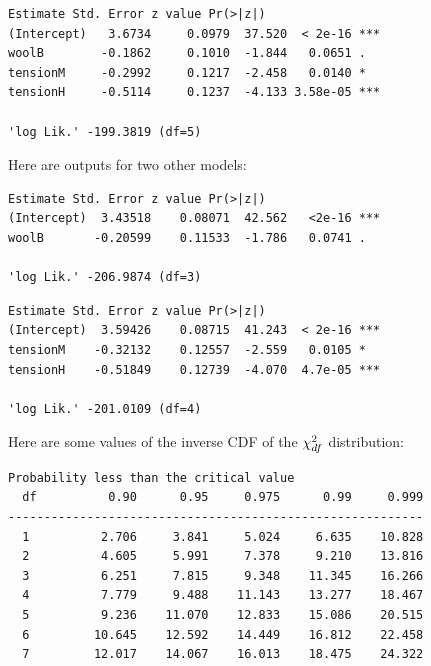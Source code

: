 \documentclass[12pt]{article}
\begin{document}
\begin{Verbatim}[frame=single]
            Estimate Std. Error z value Pr(>|z|)    
(Intercept)   3.6734     0.0979  37.520  < 2e-16 ***
woolB        -0.1862     0.1010  -1.844   0.0651 .  
tensionM     -0.2992     0.1217  -2.458   0.0140 *  
tensionH     -0.5114     0.1237  -4.133 3.58e-05 ***

'log Lik.' -199.3819 (df=5)
\end{Verbatim}

\noindent Here are outputs for two other models:

\begin{Verbatim}[frame=single]
            Estimate Std. Error z value Pr(>|z|)    
(Intercept)  3.43518    0.08071  42.562   <2e-16 ***
woolB       -0.20599    0.11533  -1.786   0.0741 .  

'log Lik.' -206.9874 (df=3)
\end{Verbatim}
\pagebreak 

\begin{Verbatim}[frame=single]
            Estimate Std. Error z value Pr(>|z|)    
(Intercept)  3.59426    0.08715  41.243  < 2e-16 ***
tensionM    -0.32132    0.12557  -2.559   0.0105 *  
tensionH    -0.51849    0.12739  -4.070  4.7e-05 *** 

'log Lik.' -201.0109 (df=4)
\end{Verbatim}

\noindent Here are some values of the inverse CDF of the $\chi^2_{df}$ distribution:

\begin{Verbatim}[frame=single,fontsize=\footnotesize]
                Probability less than the critical value
  df          0.90      0.95     0.975      0.99     0.999
----------------------------------------------------------
  1          2.706     3.841     5.024     6.635    10.828
  2          4.605     5.991     7.378     9.210    13.816
  3          6.251     7.815     9.348    11.345    16.266
  4          7.779     9.488    11.143    13.277    18.467
  5          9.236    11.070    12.833    15.086    20.515
  6         10.645    12.592    14.449    16.812    22.458
  7         12.017    14.067    16.013    18.475    24.322
\end{Verbatim}
\end{document}
